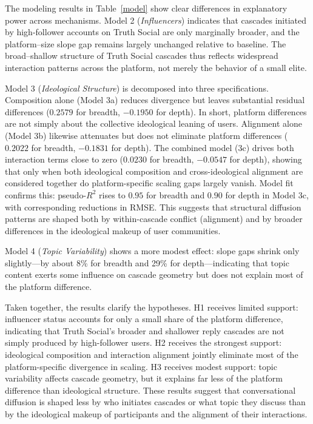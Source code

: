 \documentclass[letterpaper]{article} %
\begin{document}
The modeling results in Table~\ref{model} show clear differences in explanatory power across mechanisms. Model 2 (\textit{Influencers}) indicates that cascades initiated by high-follower accounts on Truth Social are only marginally broader, and the platform--size slope gap remains largely unchanged relative to baseline. The broad--shallow structure of Truth Social cascades thus reflects widespread interaction patterns across the platform, not merely the behavior of a small elite.

Model 3 (\textit{Ideological Structure}) is decomposed into three specifications. Composition alone (Model 3a) reduces divergence but leaves substantial residual differences ($0.2579$ for breadth, $-0.1950$ for depth). In short, platform differences are not simply about the collective ideological leaning of users. Alignment alone (Model 3b) likewise attenuates but does not eliminate platform differences ($0.2022$ for breadth, $-0.1831$ for depth). The combined model (3c) drives both interaction terms close to zero ($0.0230$ for breadth, $-0.0547$ for depth), showing that only when both ideological composition and cross-ideological alignment are considered together do platform-specific scaling gaps largely vanish. Model fit confirms this: pseudo-$R^2$ rises to $0.95$ for breadth and $0.90$ for depth in Model 3c, with corresponding reductions in RMSE. This suggests that structural diffusion patterns are shaped both by within-cascade conflict (alignment) and by broader differences in the ideological makeup of user communities.

Model 4 (\textit{Topic Variability}) shows a more modest effect: slope gaps shrink only slightly---by about 8\% for breadth and 29\% for depth---indicating that topic content exerts some influence on cascade geometry but does not explain most of the platform difference.

Taken together, the results clarify the hypotheses. H1 receives limited support: influencer status accounts for only a small share of the platform difference, indicating that Truth Social's broader and shallower reply cascades are not simply produced by high-follower users. H2 receives the strongest support: ideological composition and interaction alignment jointly eliminate most of the platform-specific divergence in scaling. H3 receives modest support: topic variability affects cascade geometry, but it explains far less of the platform difference than ideological structure. These results suggest that conversational diffusion is shaped less by who initiates cascades or what topic they discuss than by the ideological makeup of participants and the alignment of their interactions.
\end{document}
